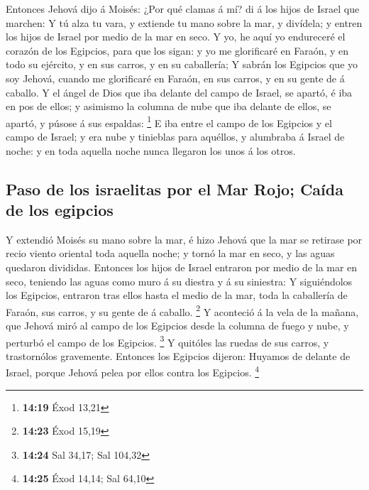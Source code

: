  Entonces Jehová dijo á Moisés: ¿Por qué clamas á mí? di á
los hijos de Israel que marchen:  Y tú alza tu vara, y
extiende tu mano sobre la mar, y divídela; y entren los hijos de Israel
por medio de la mar en seco.  Y yo, he aquí yo endureceré
el corazón de los Egipcios, para que los sigan: y yo me glorificaré en
Faraón, y en todo su ejército, y en sus carros, y en su caballería;
 Y sabrán los Egipcios que yo soy Jehová, cuando me
glorificaré en Faraón, en sus carros, y en su gente de á caballo.
 Y el ángel de Dios que iba delante del campo de Israel, se
apartó, é iba en pos de ellos; y asimismo la columna de nube que iba
delante de ellos, se apartó, y púsose á sus espaldas: \footnote{\textbf{14:19}
  Éxod 13,21}  E iba entre el campo de los Egipcios y el
campo de Israel; y era nube y tinieblas para aquéllos, y alumbraba á
Israel de noche: y en toda aquella noche nunca llegaron los unos á los
otros.

\hypertarget{paso-de-los-israelitas-por-el-mar-rojo-cauxedda-de-los-egipcios}{%
\subsection{Paso de los israelitas por el Mar Rojo; Caída de los
egipcios}\label{paso-de-los-israelitas-por-el-mar-rojo-cauxedda-de-los-egipcios}}

 Y extendió Moisés su mano sobre la mar, é hizo Jehová que
la mar se retirase por recio viento oriental toda aquella noche; y tornó
la mar en seco, y las aguas quedaron divididas.  Entonces
los hijos de Israel entraron por medio de la mar en seco, teniendo las
aguas como muro á su diestra y á su siniestra:  Y
siguiéndolos los Egipcios, entraron tras ellos hasta el medio de la mar,
toda la caballería de Faraón, sus carros, y su gente de á caballo.
\footnote{\textbf{14:23} Éxod 15,19}  Y aconteció á la vela
de la mañana, que Jehová miró al campo de los Egipcios desde la columna
de fuego y nube, y perturbó el campo de los Egipcios. \footnote{\textbf{14:24}
  Sal 34,17; Sal 104,32}  Y quitóles las ruedas de sus
carros, y trastornólos gravemente. Entonces los Egipcios dijeron:
Huyamos de delante de Israel, porque Jehová pelea por ellos contra los
Egipcios. \footnote{\textbf{14:25} Éxod 14,14; Sal 64,10}

